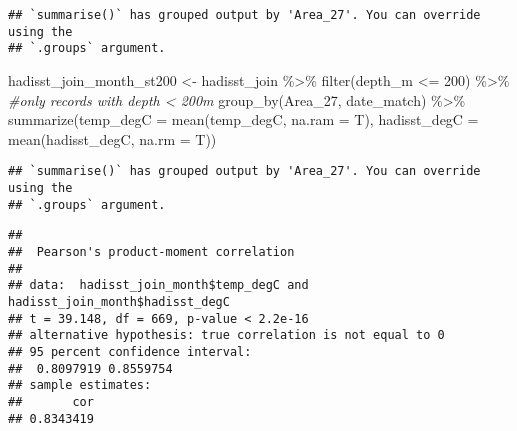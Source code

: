 \documentclass[
]{article}
\newenvironment{Shaded}{\begin{snugshade}}{\end{snugshade}}
\newcommand{\AttributeTok}[1]{\textcolor[rgb]{0.77,0.63,0.00}{#1}}
\newcommand{\CommentTok}[1]{\textcolor[rgb]{0.56,0.35,0.01}{\textit{#1}}}
\newcommand{\DecValTok}[1]{\textcolor[rgb]{0.00,0.00,0.81}{#1}}
\newcommand{\FunctionTok}[1]{\textcolor[rgb]{0.00,0.00,0.00}{#1}}
\newcommand{\NormalTok}[1]{#1}
\newcommand{\OtherTok}[1]{\textcolor[rgb]{0.56,0.35,0.01}{#1}}
\newcommand{\SpecialCharTok}[1]{\textcolor[rgb]{0.00,0.00,0.00}{#1}}
\begin{document}
\begin{verbatim}
## `summarise()` has grouped output by 'Area_27'. You can override using the
## `.groups` argument.
\end{verbatim}

\begin{Shaded}
\begin{Highlighting}[]
\NormalTok{hadisst\_join\_month\_st200 }\OtherTok{\textless{}{-}}\NormalTok{ hadisst\_join }\SpecialCharTok{\%\textgreater{}\%} 
  \FunctionTok{filter}\NormalTok{(depth\_m }\SpecialCharTok{\textless{}=} \DecValTok{200}\NormalTok{) }\SpecialCharTok{\%\textgreater{}\%} \CommentTok{\#only records with depth \textless{} 200m}
  \FunctionTok{group\_by}\NormalTok{(Area\_27, date\_match) }\SpecialCharTok{\%\textgreater{}\%} 
  \FunctionTok{summarize}\NormalTok{(}\AttributeTok{temp\_degC =} \FunctionTok{mean}\NormalTok{(temp\_degC, }\AttributeTok{na.ram =}\NormalTok{ T),}
            \AttributeTok{hadisst\_degC =} \FunctionTok{mean}\NormalTok{(hadisst\_degC, }\AttributeTok{na.rm =}\NormalTok{ T))}
\end{Highlighting}
\end{Shaded}

\begin{verbatim}
## `summarise()` has grouped output by 'Area_27'. You can override using the
## `.groups` argument.
\end{verbatim}

\begin{Shaded}
\end{Shaded}

\begin{verbatim}
## 
##  Pearson's product-moment correlation
## 
## data:  hadisst_join_month$temp_degC and hadisst_join_month$hadisst_degC
## t = 39.148, df = 669, p-value < 2.2e-16
## alternative hypothesis: true correlation is not equal to 0
## 95 percent confidence interval:
##  0.8097919 0.8559754
## sample estimates:
##       cor 
## 0.8343419
\end{verbatim}
\end{document}
